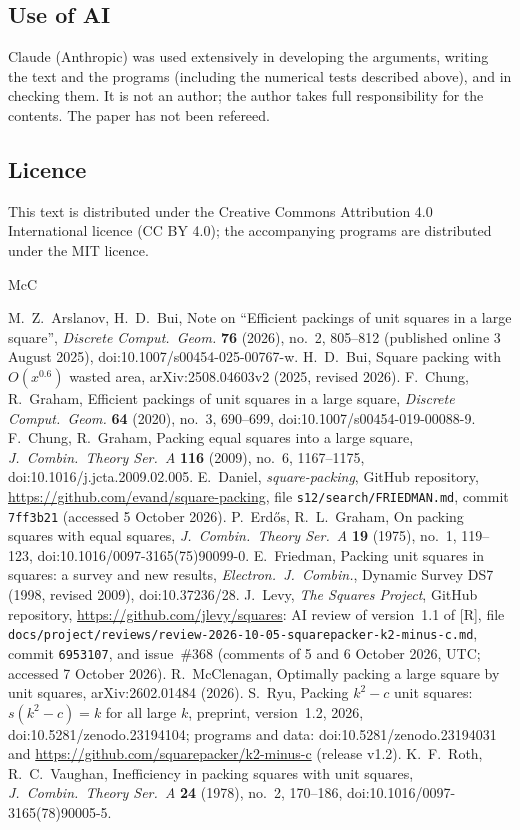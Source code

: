 \documentclass[11pt]{amsart}
\theoremstyle{definition}
\theoremstyle{remark}
\numberwithin{equation}{section}
\begin{document}
\subsection*{Use of AI}
Claude (Anthropic) was used extensively in developing the arguments, writing the text and the programs (including the
numerical tests described above), and in checking them. It is not an author; the author takes full responsibility for the
contents. The paper has not been refereed.

\subsection*{Licence}
This text is distributed under the Creative Commons Attribution 4.0 International licence (CC BY 4.0); the accompanying
programs are distributed under the MIT licence.

\begin{thebibliography}{McC}
\raggedright
{} M.~Z.~Arslanov, H.~D.~Bui, Note on ``Efficient packings of unit squares in a large square'',
\emph{Discrete Comput.\ Geom.} \textbf{76} (2026), no.~2, 805--812 (published online 3 August 2025), doi:10.1007/s00454-025-00767-w.
 H.~D.~Bui, Square packing with $O(x^{0.6})$ wasted area, arXiv:2508.04603v2 (2025, revised 2026).
 F.~Chung, R.~Graham, Efficient packings of unit squares in a large square, \emph{Discrete Comput.\ Geom.}
\textbf{64} (2020), no.~3, 690--699, doi:10.1007/s00454-019-00088-9.
 F.~Chung, R.~Graham, Packing equal squares into a large square, \emph{J.\ Combin.\ Theory Ser.\ A}
\textbf{116} (2009), no.~6, 1167--1175, doi:10.1016/j.jcta.2009.02.005.
 E.~Daniel, \emph{square-packing}, GitHub repository, \url{https://github.com/evand/square-packing},
file \texttt{s12/search/FRIEDMAN.md}, commit \texttt{7ff3b21} (accessed 5 October 2026).
 P.~Erd\H{o}s, R.~L.~Graham, On packing squares with equal squares, \emph{J.\ Combin.\ Theory Ser.\ A}
\textbf{19} (1975), no.~1, 119--123, doi:10.1016/0097-3165(75)90099-0.
 E.~Friedman, Packing unit squares in squares: a survey and new results, \emph{Electron.\ J.\ Combin.},
Dynamic Survey DS7 (1998, revised 2009), doi:10.37236/28.
 J.~Levy, \emph{The Squares Project}, GitHub repository, \url{https://github.com/jlevy/squares}: AI review of
version~1.1 of [R], file \texttt{docs/project/reviews/review-2026-10-05-squarepacker-k2-minus-c.md}, commit \texttt{6953107},
and issue~\#368 (comments of 5 and 6 October 2026, UTC; accessed 7 October 2026).
 R.~McClenagan, Optimally packing a large square by unit squares, arXiv:2602.01484 (2026).
 S.~Ryu, Packing $k^2-c$ unit squares: $s(k^2-c)=k$ for all large $k$, preprint, version~1.2, 2026,
doi:10.5281/zenodo.23194104; programs and data: doi:10.5281/zenodo.23194031 and
\url{https://github.com/squarepacker/k2-minus-c} (release v1.2).
 K.~F.~Roth, R.~C.~Vaughan, Inefficiency in packing squares with unit squares, \emph{J.\ Combin.\ Theory Ser.\ A}
\textbf{24} (1978), no.~2, 170--186, doi:10.1016/0097-3165(78)90005-5.
\end{thebibliography}
\end{document}
